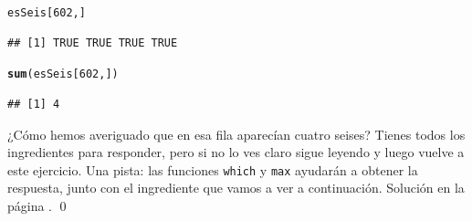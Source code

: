 \documentclass[10pt,a4paper]{article}\usepackage[]{graphicx}\usepackage[]{color}
\makeatletter
\newcommand{\hlnum}[1]{\textcolor[rgb]{0.686,0.059,0.569}{#1}}%
\newcommand{\hlstd}[1]{\textcolor[rgb]{0.345,0.345,0.345}{#1}}%
\newcommand{\hlkwd}[1]{\textcolor[rgb]{0.737,0.353,0.396}{\textbf{#1}}}%
\newenvironment{kframe}{%
 \def\at@end@of@kframe{}%
 \ifinner\ifhmode%
  \def\at@end@of@kframe{\end{minipage}}%
  \begin{minipage}{\columnwidth}%
 \fi\fi%
 \def\FrameCommand##1{\hskip\@totalleftmargin \hskip-\fboxsep
 \colorbox{shadecolor}{##1}\hskip-\fboxsep
     \hskip-\linewidth \hskip-\@totalleftmargin \hskip\columnwidth}%
 \MakeFramed {\advance\hsize-\width
   \@totalleftmargin\z@ \linewidth\hsize
   \@setminipage}}%
 {\par\unskip\endMakeFramed%
 \at@end@of@kframe}
\newenvironment{knitrout}{}{} %
\newcounter {cont01}
\makeatother
\begin{document}
\begin{knitrout}
\color{fgcolor}\begin{kframe}
\begin{alltt}
\hlstd{esSeis[}\hlnum{602}\hlstd{, ]}
\end{alltt}
\begin{verbatim}
## [1] TRUE TRUE TRUE TRUE
\end{verbatim}
\begin{alltt}
\hlkwd{sum}\hlstd{(esSeis[}\hlnum{602}\hlstd{, ])}
\end{alltt}
\begin{verbatim}
## [1] 4
\end{verbatim}
\end{kframe}
\end{knitrout}

\begin{ejercicio}
\label{tut03:ejercicio10}
\quad
¿Cómo hemos averiguado que en esa fila aparecían cuatro seises? Tienes todos los ingredientes para responder, pero si no lo ves claro sigue leyendo y luego vuelve a este ejercicio. Una pista: las funciones {\tt which} y {\tt max} ayudarán a obtener la respuesta, junto con el ingrediente que vamos a ver a continuación. Solución en la página \pageref{tut03:ejercicio10:sol}.
\qed
\end{ejercicio}
\end{document}

